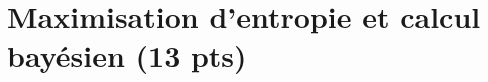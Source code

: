 \documentclass[10pt]{article}
\newcommand{\E}{\mbox{E}}
\newcommand{\V}{\mbox{Var}}
\newcommand{\1}{\mathbbm{1}}
\begin{document}
\begin{enumerate}
\end{enumerate}

\section{Maximisation d'entropie et calcul bay\'esien (13 pts) }\label{max.entropie}
\end{document}
